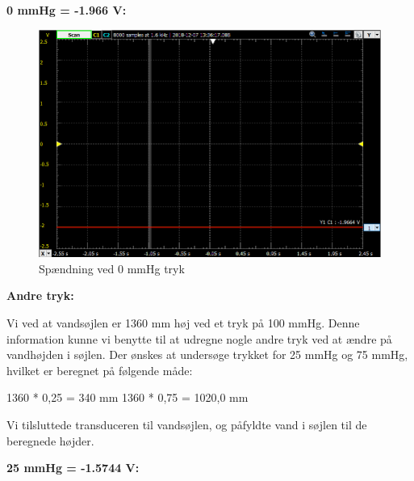 \vspace{0.2 cm}

\textbf{0 mmHg  =  -1.966 V:}

\vspace{0.2 cm}


\begin{figure}[h!]
	\centering
	\includegraphics[width=1\linewidth]{Hardwaredesign/mmHg0}
	\caption{Spændning ved 0 mmHg tryk}
	\label{fig:0mmHg}
\end{figure}

\vspace{0.2 cm}

\textbf{Andre tryk:}

\vspace{0.2 cm}

Vi ved at vandsøjlen er 1360 mm høj ved et tryk på 100 mmHg. Denne information kunne vi benytte til at udregne nogle andre tryk ved at ændre på vandhøjden i søjlen.
Der ønskes at undersøge trykket for 25 mmHg og 75 mmHg, hvilket er beregnet på følgende måde:

1360 * 0,25 = 340 mm
1360 * 0,75 = 1020,0 mm

Vi tilsluttede transduceren til vandsøjlen, og påfyldte vand i søjlen til de beregnede højder.

\vspace{0.2 cm}

\textbf{25 mmHg  =  -1.5744 V:}

\vspace{0.2 cm}

